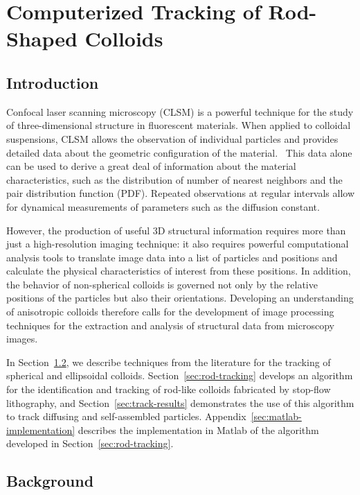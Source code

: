\chapter{Computerized Tracking of Rod-Shaped Colloids}
\label{ch:comp-tracking}

\section{Introduction}

Confocal laser scanning microscopy (CLSM) is a powerful technique for the study of three-dimensional
structure in fluorescent materials. When applied to colloidal suspensions, CLSM allows the observation
of individual particles and provides detailed data about the geometric configuration of the 
material.~\cite{weitz-confocal}
This data alone can be used to derive a great deal
of information about the material
characteristics, such as the distribution of number of nearest neighbors and
the pair distribution function (PDF). Repeated observations at regular intervals allow for dynamical
measurements of parameters such as the diffusion constant.~\cite{weitz-confocal,crocker-grier-spheres}

However, 
the production of useful 3D structural information requires more than just a 
high-resolution imaging technique: it also
requires powerful computational analysis tools to translate image data into a list of particles and positions and
calculate the physical characteristics of interest
from these positions.  In addition, the behavior of non-spherical colloids
is governed not only by the relative positions of the particles but also their orientations. Developing an
understanding of anisotropic colloids
therefore calls for the development of image processing techniques for the extraction and analysis of
structural data from microscopy images.

In Section~\ref{sec:track-background}, we describe techniques from the literature for the tracking of 
spherical and ellipsoidal colloids.  Section~\ref{sec:rod-tracking} develops an algorithm for the identification
and tracking of rod-like colloids fabricated by stop-flow lithography, and Section~\ref{sec:track-results}
demonstrates the use of this algorithm to track diffusing and self-assembled particles.
Appendix~\ref{sec:matlab-implementation} describes the implementation in Matlab of the algorithm developed in 
Section~\ref{sec:rod-tracking}.

\section{Background}
\label{sec:track-background}

